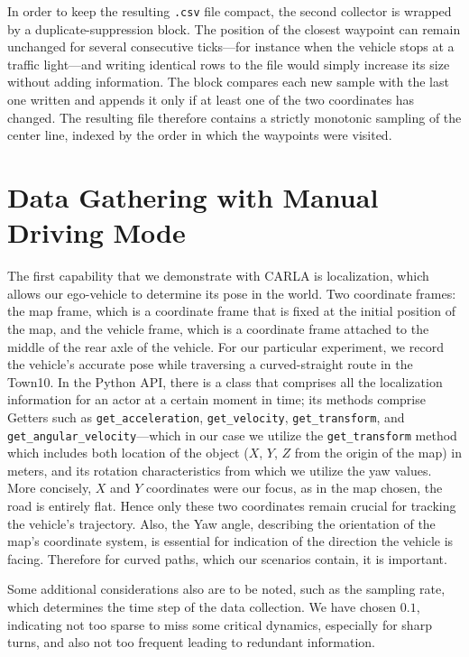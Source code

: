 In order to keep the resulting \texttt{.csv} file compact, the second collector is wrapped by a duplicate-suppression block. The position of the closest waypoint can remain unchanged for several consecutive ticks---for instance when the vehicle stops at a traffic light---and writing identical rows to the file would simply increase its size without adding information. The block compares each new sample with the last one written and appends it only if at least one of the two coordinates has changed. The resulting file therefore contains a strictly monotonic sampling of the center line, indexed by the order in which the waypoints were visited.

\section{Data Gathering with Manual Driving Mode}
The first capability that we demonstrate with CARLA is localization, which allows our ego-vehicle to determine its pose in the world. Two coordinate frames: the map frame, which is a coordinate frame that is fixed at the initial position of the map, and the vehicle frame, which is a coordinate frame attached to the middle of the rear axle of the vehicle. For our particular experiment, we record the vehicle's accurate pose while traversing a curved-straight route in the Town10. In the Python API, there is a class that comprises all the localization information for an actor at a certain moment in time; its methods comprise Getters such as \texttt{get\_acceleration}, \texttt{get\_velocity}, \texttt{get\_transform}, and \texttt{get\_angular\_velocity}---which in our case we utilize the \texttt{get\_transform} method which includes both location of the object ($X$, $Y$, $Z$ from the origin of the map) in meters, and its rotation characteristics from which we utilize the yaw values. More concisely, $X$ and $Y$ coordinates were our focus, as in the map chosen, the road is entirely flat. Hence only these two coordinates remain crucial for tracking the vehicle's trajectory. Also, the Yaw angle, describing the orientation of the map's coordinate system, is essential for indication of the direction the vehicle is facing. Therefore for curved paths, which our scenarios contain, it is important.

Some additional considerations also are to be noted, such as the sampling rate, which determines the time step of the data collection. We have chosen $0.1$, indicating not too sparse to miss some critical dynamics, especially for sharp turns, and also not too frequent leading to redundant information.

